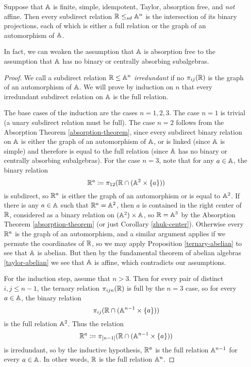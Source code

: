 \documentclass[letterpaper,11pt]{article}
\begin{document}
\begin{thm}\label{absorption-free} Suppose that $\mathbb{A}$ is finite, simple, idempotent, Taylor, absorption free, and \emph{not} affine. Then every subdirect relation $\mathbb{R} \le_{sd} \mathbb{A}^n$ is the intersection of its binary projections, each of which is either a full relation or the graph of an automorphism of $\mathbb{A}$.

In fact, we can weaken the assumption that $\mathbb{A}$ is absorption free to the assumption that $\mathbb{A}$ has no binary or centrally absorbing subalgebras.
\end{thm}
\begin{proof} We call a subdirect relation $\mathbb{R} \le \mathbb{A}^n$ \emph{irredundant} if no $\pi_{ij}(\mathbb{R})$ is the graph of an automorphism of $\mathbb{A}$. We will prove by induction on $n$ that every irredundant subdirect relation on $\mathbb{A}$ is the full relation.

The base cases of the induction are the cases $n = 1,2,3$. The case $n = 1$ is trivial (a unary subdirect relation must be full). The case $n=2$ follows from the Absorption Theorem \ref{absorption-theorem}, since every subdirect binary relation on $\mathbb{A}$ is either the graph of an automorphism of $\mathbb{A}$, or is linked (since $\mathbb{A}$ is simple) and therefore is equal to the full relation (since $\mathbb{A}$ has no binary or centrally absorbing subalgebras). For the case $n=3$, note that for any $a \in \mathbb{A}$, the binary relation
\[
\mathbb{R}^a \coloneqq \pi_{12}(\mathbb{R} \cap (\mathbb{A}^2\times\{a\}))
\]
is subdirect, so $\mathbb{R}^a$ is either the graph of an automorphism or is equal to $\mathbb{A}^2$. If there is any $a \in \mathbb{A}$ such that $\mathbb{R}^a = \mathbb{A}^2$, then $a$ is contained in the right center of $\mathbb{R}$, considered as a binary relation on $(\mathbb{A}^2)\times \mathbb{A}$, so $\mathbb{R} = \mathbb{A}^3$ by the Absorption Theorem \ref{absorption-theorem} (or just Corollary \ref{zhuk-center}). Otherwise every $\mathbb{R}^a$ is the graph of an automorphism, and a similar argument applies if we permute the coordinates of $\mathbb{R}$, so we may apply Proposition \ref{ternary-abelian} to see that $\mathbb{A}$ is abelian. But then by the fundamental theorem of abelian algebras \ref{taylor-abelian} we see that $\mathbb{A}$ is affine, which contradicts our assumptions.

For the induction step, assume that $n > 3$. Then for every pair of distinct $i,j \le n-1$, the ternary relation $\pi_{ijn}(\mathbb{R})$ is full by the $n=3$ case, so for every $a \in \mathbb{A}$, the binary relation
\[
\pi_{ij}(\mathbb{R} \cap (\mathbb{A}^{n-1}\times \{a\}))
\]
is the full relation $\mathbb{A}^2$. Thus the relation
\[
\mathbb{R}^a \coloneqq \pi_{[n-1]}(\mathbb{R} \cap (\mathbb{A}^{n-1}\times \{a\}))
\]
is irredundant, so by the inductive hypothesis, $\mathbb{R}^a$ is the full relation $\mathbb{A}^{n-1}$ for every $a \in \mathbb{A}$. In other words, $\mathbb{R}$ is the full relation $\mathbb{A}^n$.
\end{proof}
\end{document}
